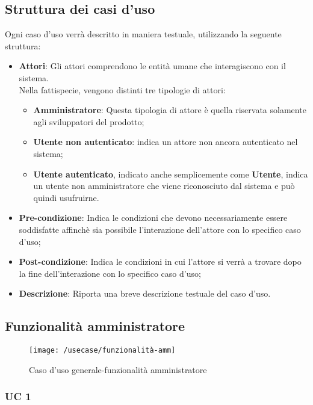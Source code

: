 \subsection{Struttura dei casi d'uso}
Ogni caso d'uso verrà descritto in maniera testuale, utilizzando la seguente struttura:
\begin{itemize}
	\item \textbf{Attori}: Gli attori comprendono le entità umane che interagiscono con il sistema. \\ 
	Nella fattispecie, vengono distinti tre tipologie di attori:
	\begin{itemize}
		\item \textbf{Amministratore}: Questa tipologia di attore è quella riservata solamente agli sviluppatori del prodotto;
		\item \textbf{Utente non autenticato}: indica un attore non ancora autenticato nel sistema;
		\item \textbf{Utente autenticato}, indicato anche semplicemente come \textbf{Utente}, indica un utente non amministratore che viene riconosciuto dal sistema e può quindi usufruirne.
	\end{itemize}
	\item \textbf{Pre-condizione}: Indica le condizioni che devono necessariamente essere soddisfatte affinchè sia possibile l'interazione dell'attore con lo specifico caso d'uso;
	\item \textbf{Post-condizione}: Indica le condizioni in cui l'attore si verrà a trovare dopo la fine dell'interazione con lo specifico caso d'uso;
	\item \textbf{Descrizione}: Riporta una breve descrizione testuale del caso d'uso.
\end{itemize}
\subsection{Funzionalità amministratore}
\begin{figure}[h]
	\centering
	\texttt{[image: /usecase/funzionalità-amm]}
	\caption{Caso d'uso generale-funzionalità amministratore}
\end{figure}

\subsubsection{UC 1}

